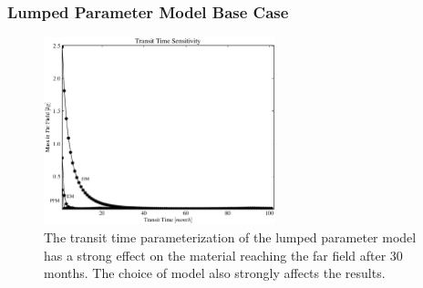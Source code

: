 
\begin{frame}[ctb!]
\frametitle{Lumped Parameter Model Base Case}
\begin{figure}[ht]
\centering
\includegraphics[width=0.6\textwidth]{./images/lp_t_t.eps}
\caption[Lumped Parameter Transit Time Sensitivity]{The transit time 
parameterization of the lumped parameter model
has a strong effect on the material reaching the far field after 30 
months. The choice of model also strongly affects the results. }
\label{fig:lp_t_t_begin}
\end{figure}
\end{frame}
